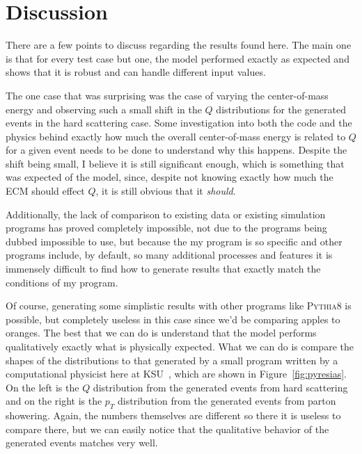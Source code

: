 \section{Discussion}

There are a few points to discuss regarding the results found here. The main one is that for every test case but one, the model performed exactly as expected and shows that it is robust and can handle different input values.

The one case that was surprising was the case of varying the center-of-mass energy and observing such a small shift in the $Q$ distributions for the generated events in the hard scattering case. Some investigation into both the code and the physics behind exactly how much the overall center-of-mass energy is related to $Q$ for a given event needs to be done to understand why this happens. Despite the shift being small, I believe it is still significant enough, which is something that was expected of the model, since, despite not knowing exactly how much the ECM should effect $Q$, it is still obvious that it \textit{should}.

Additionally, the lack of comparison to existing data or existing simulation programs has proved completely impossible, not due to the programs being dubbed impossible to use, but because the my program is so specific and other programs include, by default, so many additional processes and features it is immensely difficult to find how to generate results that exactly match the conditions of my program.

Of course, generating some simplistic results with other programs like \textsc{Pythia8} is possible, but completely useless in this case since we'd be comparing apples to oranges. The best that we can do is understand that the model performs qualitatively exactly what is physically expected. What we can do is compare the shapes of the distributions to that generated by a small program written by a computational physicist here at KSU~\cite{PYRESIAS}, which are shown in Figure~\ref{fig:pyresias}. On the left is the $Q$ distribution from the generated events from hard scattering and on the right is the $p_T$ distribution from the generated events from parton showering. Again, the numbers themselves are different so there it is useless to compare there, but we can easily notice that the qualitative behavior of the generated events matches very well.

